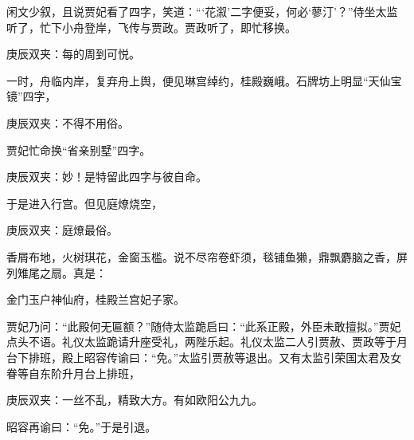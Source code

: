 \begin{parag}
    闲文少叙，且说贾妃看了四字，笑道：“‘花溆’二字便妥，何必‘蓼汀’？”侍坐太监听了，忙下小舟登岸，飞传与贾政。贾政听了，即忙移换。\begin{note}庚辰双夹：每的周到可悦。\end{note}一时，舟临内岸，复弃舟上舆，便见琳宫绰约，桂殿巍峨。石牌坊上明显“天仙宝镜”四字，\begin{note}庚辰双夹：不得不用俗。\end{note}贾妃忙命换“省亲别墅”四字。\begin{note}庚辰双夹：妙！是特留此四字与彼自命。\end{note}于是进入行宫。但见庭燎烧空，\begin{note}庚辰双夹：庭燎最俗。\end{note}香屑布地，火树琪花，金窗玉槛。说不尽帘卷虾须，毯铺鱼獭，鼎飘麝脑之香，屏列雉尾之扇。真是：
\end{parag}


\begin{poem}
    \begin{pl}金门玉户神仙府，桂殿兰宫妃子家。\end{pl}
\end{poem}


\begin{parag}
    贾妃乃问：“此殿何无匾额？”随侍太监跪启曰：“此系正殿，外臣未敢擅拟。”贾妃点头不语。礼仪太监跪请升座受礼，两陛乐起。礼仪太监二人引贾赦、贾政等于月台下排班，殿上昭容传谕曰：“免。”太监引贾赦等退出。又有太监引荣国太君及女眷等自东阶升月台上排班，\begin{note}庚辰双夹：一丝不乱，精致大方。有如欧阳公九九。\end{note}昭容再谕曰：“免。”于是引退。
\end{parag}



